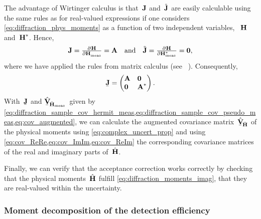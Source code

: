 The advantage of Wirtinger calculus is that~$\bm{\mathrm{J}}$
and~$\tilde{\bm{\mathrm{J}}}$ are easily calculable using the same rules as
for real-valued expressions if one considers
\cref{eq:diffraction_phys_moments} as a function of two independent
variables, ~$\bm{\mathrm{H}}$ and~$\bm{\mathrm{H}}^*$.  Hence,
\begin{equation}
  \mat{J}
  = \pd{\vect{H}}{\vect{H}_\text{meas}}
  = \mat{A}
  \quad\text{and}\quad
  \tilde{\mat{J}}
  = \pd{\vect{H}}{{\vect{H}_\text{meas}^*}}
  = \mat{0},
\end{equation}
where we have applied the rules from matrix calculus (see \eg\
).  Consequently,
\begin{equation}
  \underaccent{\bar}{\mat{J}}
  = \begin{pmatrix*}[l]
    \mat{A} & \mat{0} \\
    \mat{0} & \mat{A}^*
  \end{pmatrix*}.
\end{equation}
With~$\underaccent{\bar}{\mat{J}}$ and
$\hat{\underaccent{\bar}{\covMatSym}}_{\!\hat{\vect{H}}_\text{meas}}$~given
by
\cref{eq:diffraction_sample_cov_hermit_meas,eq:diffraction_sample_cov_pseudo_meas,eq:cov_augmented},
we can calculate the augmented covariance
matrix~$\hat{\underaccent{\bar}{\covMatSym}}_{\!\hat{\vect{H}}}$ of
the physical moments using \cref{eq:complex_uncert_prop} and using
\cref{eq:cov_ReRe,eq:cov_ImIm,eq:cov_ReIm} the corresponding
covariance matrices of the real and imaginary parts
of~$\hat{\bm{\mathrm{H}}}$.

Finally, we can verify that the acceptance correction works correctly
by checking that the physical moments~$\hat{\bm{\mathrm{H}}}$ fulfill
\cref{eq:diffraction_moments_imag}, \ie that they are real-valued
within the uncertainty.


\subsubsection{Moment decomposition of the detection efficiency}%
\label{sec:diffraction:acceptance_moment_decomp}

